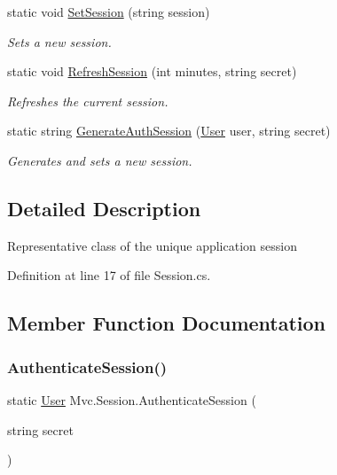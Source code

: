 \begin{DoxyCompactItemize}
static void \hyperlink{class_mvc_1_1_session_ac169bdeb3767baa5c632ece305d448f3}{Set\+Session} (string session)
\begin{DoxyCompactList}\small\item\em Sets a new session. \end{DoxyCompactList}\item 
static void \hyperlink{class_mvc_1_1_session_a6af0398d88965bc0f24f0213be2f2096}{Refresh\+Session} (int minutes, string secret)
\begin{DoxyCompactList}\small\item\em Refreshes the current session. \end{DoxyCompactList}\item 
static string \hyperlink{class_mvc_1_1_session_aeb7476f51d94c0d95d997b5b1ae85f46}{Generate\+Auth\+Session} (\hyperlink{class_mvc_1_1_user}{User} user, string secret)
\begin{DoxyCompactList}\small\item\em Generates and sets a new session. \end{DoxyCompactList}\end{DoxyCompactItemize}


\subsection{Detailed Description}
Representative class of the unique application session 



Definition at line 17 of file Session.\+cs.



\subsection{Member Function Documentation}
\mbox{\label{class_mvc_1_1_session_a348ab46e42ba38bd10246fb39541d1e8}} 
\subsubsection{\texorpdfstring{Authenticate\+Session()}{AuthenticateSession()}}
{\footnotesize\ttfamily static \hyperlink{class_mvc_1_1_user}{User} Mvc.\+Session.\+Authenticate\+Session (\begin{DoxyParamCaption}\item[{string}]{secret }\end{DoxyParamCaption})\hspace{0.3cm}{\ttfamily [static]}}



